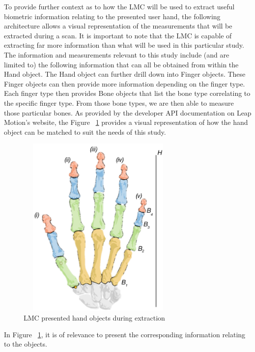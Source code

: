 To provide further context as to how the LMC will be used to extract useful biometric information relating to the presented user hand, the following architecture allows a visual representation of the measurements that will be extracted during a scan. It is important to note that the LMC is capable of extracting far more information than what will be used in this particular study. The information and measurements relevant to this study include (and are limited to) the following information that can all be obtained from within the Hand object. The Hand object can further drill down into Finger objects. These Finger objects can then provide more information depending on the finger type. Each finger type then provides Bone objects that list the bone type correlating to the specific finger type. From those bone types, we are then able to measure those particular bones.  As provided by the developer API documentation on Leap Motion’s website, the Figure ~\ref{fig:LMC presented hand objects during extraction} provides a visual representation of how the hand object can be matched to suit the needs of this study.

    
    \begin{figure}[htbp!] 
    \centering    
    \includegraphics[width=8cm,height=9cm,keepaspectratio]{Chapter3/Figs/LMC_presented_hand_objects_during_extraction.png}
    \caption[LMC presented hand objects during extraction]{LMC presented hand objects during extraction}
    \label{fig:LMC presented hand objects during extraction}
    \end{figure}

In Figure ~\ref{fig:LMC presented hand objects during extraction}, it is of relevance to present the corresponding information relating to the objects.

